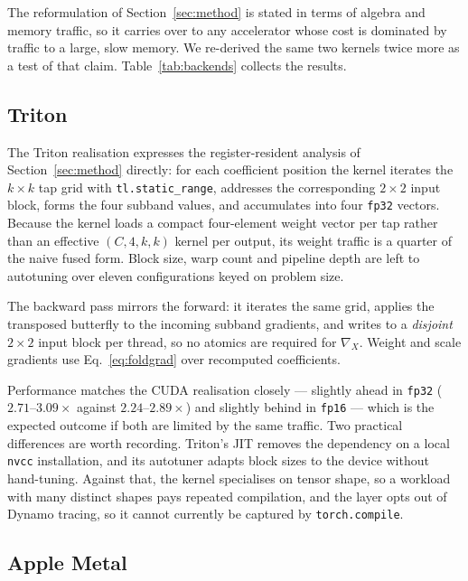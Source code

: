 The reformulation of Section~\ref{sec:method} is stated in terms of algebra and
memory traffic, so it carries over to any accelerator whose cost is dominated by
traffic to a large, slow memory. We re-derived the same two kernels twice more
as a test of that claim. Table~\ref{tab:backends} collects the results.



\subsection{Triton}

The Triton realisation \citep{tillet2019triton} expresses the register-resident
analysis of Section~\ref{sec:method} directly: for each coefficient position the
kernel iterates the $k\times k$ tap grid with \verb|tl.static_range|, addresses
the corresponding $2\times2$ input block, forms the four subband values, and
accumulates into four \texttt{fp32} vectors. Because the kernel loads a compact
four-element weight vector per tap rather than an effective $(C,4,k,k)$ kernel
per output, its weight traffic is a quarter of the naive fused form. Block size,
warp count and pipeline depth are left to autotuning over eleven configurations
keyed on problem size.

The backward pass mirrors the forward: it iterates the same grid, applies the
transposed butterfly to the incoming subband gradients, and writes to a
\emph{disjoint} $2\times2$ input block per thread, so no atomics are required for
$\nabla_{\!X}$. Weight and scale gradients use Eq.~\eqref{eq:foldgrad} over
recomputed coefficients.

Performance matches the CUDA realisation closely --- slightly ahead in
\texttt{fp32} ($2.71$--$3.09\times$ against $2.24$--$2.89\times$) and slightly
behind in \texttt{fp16} --- which is the expected outcome if both are limited by
the same traffic. Two practical differences are worth recording. Triton's JIT
removes the dependency on a local \texttt{nvcc} installation, and its autotuner
adapts block sizes to the device without hand-tuning. Against that, the kernel
specialises on tensor shape, so a workload with many distinct shapes pays
repeated compilation, and the layer opts out of Dynamo tracing, so it cannot
currently be captured by \texttt{torch.compile}.

\subsection{Apple Metal}

